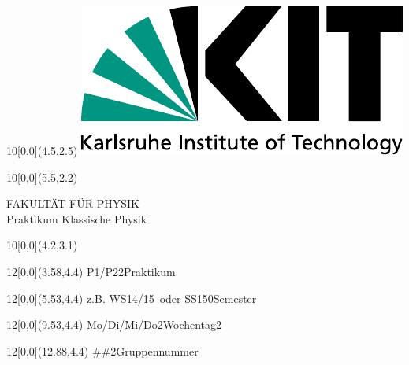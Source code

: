 \newcommand{\diameter}{20}
\newcommand{\xone}{-15}
\newcommand{\xtwo}{160}
\newcommand{\yone}{15}
\newcommand{\ytwo}{-253}

\newcommand{\hoehea}{60}
\newcommand{\hoeheb}{60}




\begin{titlepage}
    
    \begin{textblock}{10}[0,0](4.5,2.5)
        \includegraphics[width=.25\textwidth]{include/kitlogo.pdf}
    \end{textblock}
    \begin{textblock}{10}[0,0](5.5,2.2)
        \begin{flushright}
            \Large FAKULTÄT FÜR PHYSIK\\Praktikum Klassische Physik
        \end{flushright}
    \end{textblock}
    
    \begin{textblock}{10}[0,0](4.2,3.1)
    \end{textblock}
    
    \Large
    \begin{textblock}{12}[0,0](3.58,4.4)
                    {P1/P2}{2}{Praktikum}
    \end{textblock}
    \begin{textblock}{12}[0,0](5.53,4.4)
        {z.B. \glqq WS14/15\grqq\ oder \glqq SS15\grqq}{0}{Semester}
    \end{textblock}
    \begin{textblock}{12}[0,0](9.53,4.4)
                    {Mo/Di/Mi/Do}{2}{Wochentag}2
    \end{textblock}
    \begin{textblock}{12}[0,0](12.88,4.4)
                   {\#\#}{2}{Gruppennummer}
    \end{textblock}
    

\end{titlepage}
